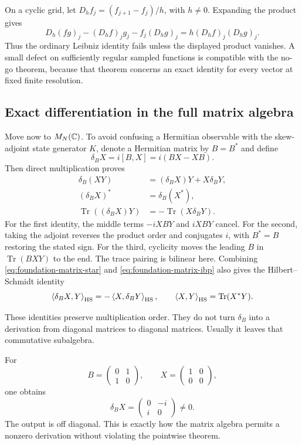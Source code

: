 \begin{example}
On a cyclic grid, let $D_hf_j=(f_{j+1}-f_j)/h$, with $h\ne0$. Expanding the product gives
\[
 D_h(fg)_j-(D_hf)_jg_j-f_j(D_hg)_j
 =h(D_hf)_j(D_hg)_j.
\]
Thus the ordinary Leibniz identity fails unless the displayed product vanishes. A small defect on sufficiently regular sampled functions is compatible with the no-go theorem, because that theorem concerns an exact identity for every vector at fixed finite resolution.
\end{example}

\subsection{Exact differentiation in the full matrix algebra}

Move now to $M_N(\mathbb C)$. To avoid confusing a Hermitian observable with the skew-adjoint state generator $K$, denote a Hermitian matrix by $B=B^*$ and define
\[
 \delta_BX=i[B,X]=i(BX-XB).
\]
Then direct multiplication proves
\begin{align}
 \delta_B(XY)&=(\delta_BX)Y+X\delta_BY,\label{eq:foundation-matrix-leibniz}\\
 (\delta_BX)^*&=\delta_B(X^*),\label{eq:foundation-matrix-star}\\
 \operatorname{Tr}((\delta_BX)Y)&=-\operatorname{Tr}(X\delta_BY).
 \label{eq:foundation-matrix-ibp}
\end{align}
For the first identity, the middle terms $-iXBY$ and $iXBY$ cancel. For the second, taking the adjoint reverses the product order and conjugates $i$, with $B^*=B$ restoring the stated sign. For the third, cyclicity moves the leading $B$ in $\operatorname{Tr}(BXY)$ to the end. The trace pairing is bilinear here. Combining \eqref{eq:foundation-matrix-star} and \eqref{eq:foundation-matrix-ibp} also gives the Hilbert--Schmidt identity
\[
 \left\langle\delta_BX,Y\right\rangle_{\rm HS}=-\left\langle X,\delta_BY\right\rangle_{\rm HS},
 \qquad\left\langle X,Y\right\rangle_{\rm HS}=\operatorname{Tr}(X^*Y).
\]

These identities preserve multiplication order. They do not turn $\delta_B$ into a derivation from diagonal matrices to diagonal matrices. Usually it leaves that commutative subalgebra.

\begin{example}
For
\[
 B=\begin{pmatrix}0&1\\1&0\end{pmatrix},\qquad
 X=\begin{pmatrix}1&0\\0&0\end{pmatrix},
\]
one obtains
\[
 \delta_BX=\begin{pmatrix}0&-i\\i&0\end{pmatrix}\ne0.
\]
The output is off diagonal. This is exactly how the matrix algebra permits a nonzero derivation without violating the pointwise theorem.
\end{example}

